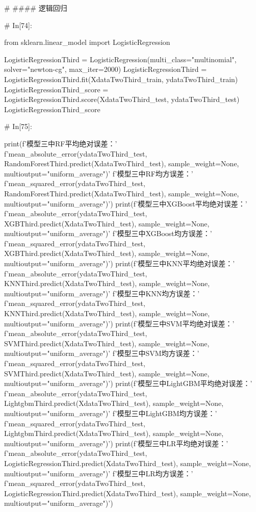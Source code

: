 \documentclass{MathorCupmodeling}
\begin{document}
\begin{python}
	# #### 逻辑回归
	
	# In[74]:
	
	
	from sklearn.linear_model import LogisticRegression
	
	LogisticRegressionThird = LogisticRegression(multi_class="multinomial", solver="newton-cg", max_iter=2000)
	LogisticRegressionThird = LogisticRegressionThird.fit(XdataTwoThird_train, ydataTwoThird_train)
	LogisticRegressionThird_score = LogisticRegressionThird.score(XdataTwoThird_test, ydataTwoThird_test)
	LogisticRegressionThird_score
	
	# In[75]:
	
	
	print(f'模型三中RF平均绝对误差：'
		  f'{mean_absolute_error(ydataTwoThird_test, RandomForestThird.predict(XdataTwoThird_test), sample_weight=None, multioutput="uniform_average")}\n'
		  f'模型三中RF均方误差：'
		  f'{mean_squared_error(ydataTwoThird_test, RandomForestThird.predict(XdataTwoThird_test), sample_weight=None, multioutput="uniform_average")}')
	print(f'模型三中XGBoost平均绝对误差：'
		  f'{mean_absolute_error(ydataTwoThird_test, XGBThird.predict(XdataTwoThird_test), sample_weight=None, multioutput="uniform_average")}\n'
		  f'模型三中XGBoost均方误差：'
		  f'{mean_squared_error(ydataTwoThird_test, XGBThird.predict(XdataTwoThird_test), sample_weight=None, multioutput="uniform_average")}')
	print(f'模型三中KNN平均绝对误差：'
		  f'{mean_absolute_error(ydataTwoThird_test, KNNThird.predict(XdataTwoThird_test), sample_weight=None, multioutput="uniform_average")}\n'
		  f'模型三中KNN均方误差：'
		  f'{mean_squared_error(ydataTwoThird_test, KNNThird.predict(XdataTwoThird_test), sample_weight=None, multioutput="uniform_average")}')
	print(f'模型三中SVM平均绝对误差：'
		  f'{mean_absolute_error(ydataTwoThird_test, SVMThird.predict(XdataTwoThird_test), sample_weight=None, multioutput="uniform_average")}\n'
		  f'模型三中SVM均方误差：'
		  f'{mean_squared_error(ydataTwoThird_test, SVMThird.predict(XdataTwoThird_test), sample_weight=None, multioutput="uniform_average")}')
	print(f'模型三中LightGBM平均绝对误差：'
		  f'{mean_absolute_error(ydataTwoThird_test, LightgbmThird.predict(XdataTwoThird_test), sample_weight=None, multioutput="uniform_average")}\n'
		  f'模型三中LightGBM均方误差：'
		  f'{mean_squared_error(ydataTwoThird_test, LightgbmThird.predict(XdataTwoThird_test), sample_weight=None, multioutput="uniform_average")}')
	print(f'模型三中LR平均绝对误差：'
		  f'{mean_absolute_error(ydataTwoThird_test, LogisticRegressionThird.predict(XdataTwoThird_test), sample_weight=None, multioutput="uniform_average")}\n'
		  f'模型三中LR均方误差：'
		  f'{mean_squared_error(ydataTwoThird_test, LogisticRegressionThird.predict(XdataTwoThird_test), sample_weight=None, multioutput="uniform_average")}')
	

\end{python}
\end{document}

